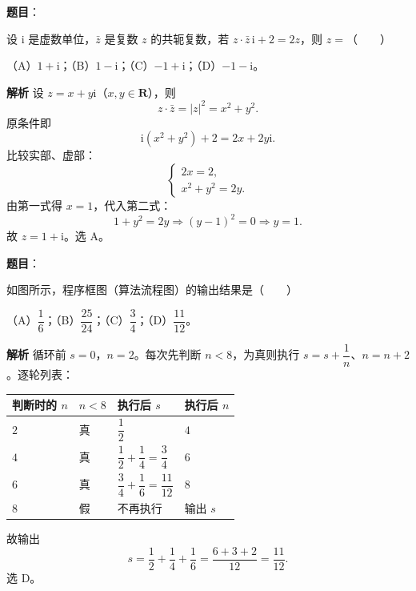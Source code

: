 

\begin{answer}

\textbf{题目}：

设 $\mathrm i$ 是虚数单位，$\bar z$ 是复数 $z$ 的共轭复数，若 $z\cdot\bar z\,\mathrm i+2=2z$，则 $z=$\mbox{（　　）}

（A）$1+\mathrm i$；（B）$1-\mathrm i$；（C）$-1+\mathrm i$；（D）$-1-\mathrm i$。

\textbf{解析}
设 $z=x+y\mathrm i$（$x,y\in\mathbf R$），则
\nopagebreak[4]
\[z\cdot\bar z=|z|^2=x^2+y^2.\]
原条件即
\nopagebreak[4]
\[\mathrm i(x^2+y^2)+2=2x+2y\mathrm i.\]
比较实部、虚部：
\nopagebreak[4]
\[\begin{cases}
2x=2,\\
x^2+y^2=2y.
\end{cases}\]
由第一式得 $x=1$，代入第二式：
\nopagebreak[4]
\[1+y^2=2y\Longrightarrow (y-1)^2=0\Longrightarrow y=1.\]
故 $z=1+\mathrm i$。选 A。


\end{answer}
\begin{answer}

\textbf{题目}：

如图所示，程序框图（算法流程图）的输出结果是\mbox{（　　）}
\nopagebreak[4]
\begin{center}\end{center}
\nopagebreak[4]
（A）$\dfrac16$；（B）$\dfrac{25}{24}$；（C）$\dfrac34$；（D）$\dfrac{11}{12}$。

\textbf{解析}
循环前 $s=0$，$n=2$。每次先判断 $n<8$，为真则执行 $s=s+\dfrac1n$、$n=n+2$。逐轮列表：

\begin{center}
\begin{tabular}{llll}
\toprule
判断时的 $n$ & $n<8$ & 执行后 $s$ & 执行后 $n$ \\
\midrule
$2$ & 真 & $\dfrac12$ & $4$ \\
$4$ & 真 & $\dfrac12+\dfrac14=\dfrac34$ & $6$ \\
$6$ & 真 & $\dfrac34+\dfrac16=\dfrac{11}{12}$ & $8$ \\
$8$ & 假 & 不再执行 & 输出 $s$ \\
\bottomrule
\end{tabular}
\end{center}

故输出
\nopagebreak[4]
\[s=\frac12+\frac14+\frac16=\frac{6+3+2}{12}=\frac{11}{12}.\]
选 D。


\end{answer}
